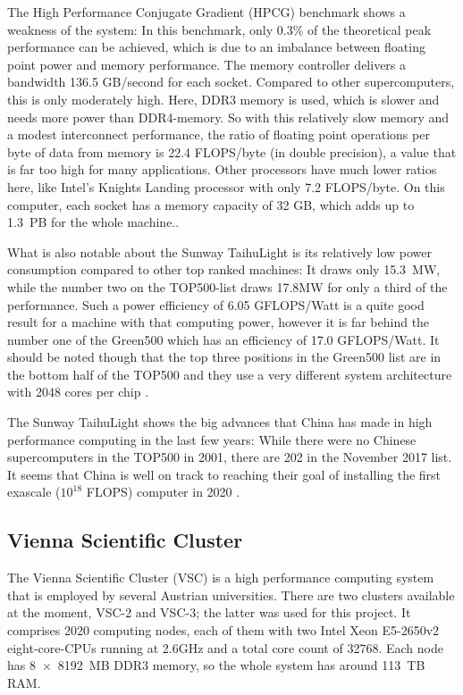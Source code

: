 The High Performance Conjugate Gradient (HPCG) benchmark shows a weakness of the system: In this benchmark, only 0.3\% of the theoretical peak performance can be achieved, which is due to an imbalance between floating point power and memory performance. The memory controller delivers a bandwidth 136.5 GB/second for each socket. Compared to other supercomputers, this is only moderately high. Here, DDR3 memory is used, which is slower and needs more power than DDR4-memory. So with this relatively slow memory and a modest interconnect performance, the ratio of floating point operations per byte of data from memory is 22.4 FLOPS/byte (in double precision), a value that is far too high for many applications. Other processors have much lower ratios here, like Intel's Knights Landing processor with only 7.2 FLOPS/byte. On this computer, each socket has a memory capacity of 32 GB, which adds up to 1.3~PB for the whole machine.\cite{fu2016sunway, dongarra2016report}.


What is also notable about the Sunway TaihuLight is its relatively low power consumption compared to other top ranked machines: It draws only 15.3~MW, while the number two on the TOP500-list draws 17.8MW for only a third of the performance. Such a power efficiency of 6.05 GFLOPS/Watt is a quite good result for a machine with that computing power, however it is far behind the number one of the Green500 which has an efficiency of 17.0 GFLOPS/Watt. It should be noted though that the top three positions in the Green500 list are in the bottom half of the TOP500 and they use a very different system architecture with 2048 cores per chip \cite{green500}.

The Sunway TaihuLight shows the big advances that China has made in high performance computing in the last few years: While there were no Chinese supercomputers in the TOP500 in 2001, there are 202 in the November 2017 list. It seems that China is well on track to reaching their goal of installing the first exascale ($10^{18}$ FLOPS) computer in 2020 \cite{dongarra2016report}.

\subsection{Vienna Scientific Cluster}
\label{sec:vsc3}

The Vienna Scientific Cluster (VSC) is a high performance computing system that is employed by several Austrian universities. There are two clusters available at the moment, VSC-2 and VSC-3; the latter was used for this project. It comprises 2020 computing nodes, each of them with two Intel Xeon E5-2650v2 eight-core-CPUs running at 2.6GHz and a total core count of 32768. Each node has 8~$\times$~8192~MB DDR3 memory, so the whole system has around 113~TB RAM.

